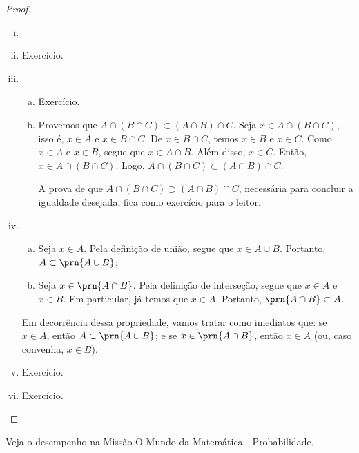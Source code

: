 \begin{proof}
\begin{enumerate}[i)]
\item[]
\item Exercício.
\item
	\begin{enumerate}[a)]
		\item 
		Exercício.

		\item
		Provemos que $A \cap (B \cap C) \subset (A \cap B) \cap C$. 
		Seja $x \in A \cap (B \cap C)$, isso é, $x \in A$ e $x \in B \cap C$.
		De $x \in B \cap C$, temos $x \in B$ e $x \in C$.
		Como $x \in A$ e $x \in B$, segue que $x \in A \cap B$.
		Além disso, $x \in C$.
		Então, $x \in A \cap (B \cap C)$.
		Logo, $A \cap (B \cap C) \subset (A \cap B) \cap C$. 

		A prova de que $A \cap (B \cap C) \supset (A \cap B) \cap C$, necessária para concluir a igualdade desejada, fica como exercício para o leitor.

	\end{enumerate}

\item 	
	\begin{enumerate}[a)]
		\item Seja $x \in A$. Pela definição de união, segue que $x \in A \cup B$. Portanto, $A \subset \prn{A \cup B}$;
		\item Seja $x \in \prn{A \cap B}$. Pela definição de interseção, segue que $x\in A$ e $x \in B$. 
		Em particular, já temos que $x \in A$. Portanto, $\prn{A \cap B} \subset A$.
	\end{enumerate}
	Em decorrência dessa propriedade, vamos tratar como imediatos que: 
	se $x \in A$, então $A \subset \prn{A \cup B}$; 
	e se $x \in \prn{A \cap B}$, então $x\in A$ (ou, caso convenha, $x\in B$).
\item Exercício.
\item Exercício.
\end{enumerate}
\end{proof}

\begin{onlineact}
Veja o desempenho na Missão O Mundo da Matemática - Probabilidade.
\end{onlineact}


